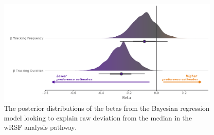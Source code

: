 \documentclass[10pt,a4paper]{article}
\begin{document}
\begin{figure}
\includegraphics[width=1\linewidth]{../figures/wrsf_rEstwrsf_effectsPlot} \caption{The posterior distributions of the betas from the Bayesian regression model looking to explain raw deviation from the median in the wRSF analysis pathway.}\label{fig:rEstBetasWRSF}
\end{figure}
\end{document}
